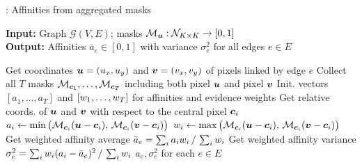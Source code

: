 \begin{algorithm}[t]
  \begin{flushleft}
  \caption{: Affinities from aggregated \maskname masks}
   \hspace*{\algorithmicindent} \textbf{Input:} Graph $\mathcal{G}(V,E)$; \maskname masks $\mathcal{M}_{\coord{u}}: \mathcal{N}_{K\times K} \rightarrow [0,1]$  \\
  \hspace*{\algorithmicindent} \textbf{Output:} Affinities $\bar{a}_e\in[0,1]$ with variance $\sigma^2_e$ for all edges $e\in E$\\
  \hspace*{\algorithmicindent} 
  \begin{algorithmic}[1]
  \footnotesize
        \State Get coordinates $\coord{u}=(u_x,u_y)$ and $\coord{v}=(v_x,v_y)$ of pixels linked by edge $e$
        \State Collect all $T$ masks $\mathcal{M}_{\coord{c}_1},\ldots,\mathcal{M}_{\coord{c}_T}$ including both pixel $\coord{u}$ and pixel $\coord{v}$
        \State Init. vectors $[a_1,\ldots,a_T]$ and $[w_1,\ldots,w_T]$ for affinities and evidence weights
            \State Get relative coords. of $\coord{u}$ and $\coord{v}$ with respect to the central pixel $\coord{c}_i$
            \State $a_i \gets \min \big(\mathcal{M}_{\coord{c}_i}(\coord{u} - \coord{c}_i), \,\mathcal{M}_{\coord{c}_i}(\coord{v} - \coord{c}_i)\big)$ 
            \State $\evidW_i \gets \max \big(\mathcal{M}_{\coord{c}_i}(\coord{u} - \coord{c}_i), \,\mathcal{M}_{\coord{c}_i}(\coord{v} - \coord{c}_i)\big)$ 
        \EndFor
        \State Get weighted affinity average $\bar{a}_e= \sum_{i} a_i w_i\,/\,\sum_{i}w_i$ 
        \State Get weighted affinity variance $\sigma^2_e = \sum_{i} w_i (a_i-\bar{a}_e)^2\,/\,\sum_{i}w_i$
      \EndFor
      \State
      \Return $a_e, \sigma^2_e$ for each $e\in E$
  \end{algorithmic}
    \label{alg:computing_affinities}
  \end{flushleft}

\end{algorithm}

